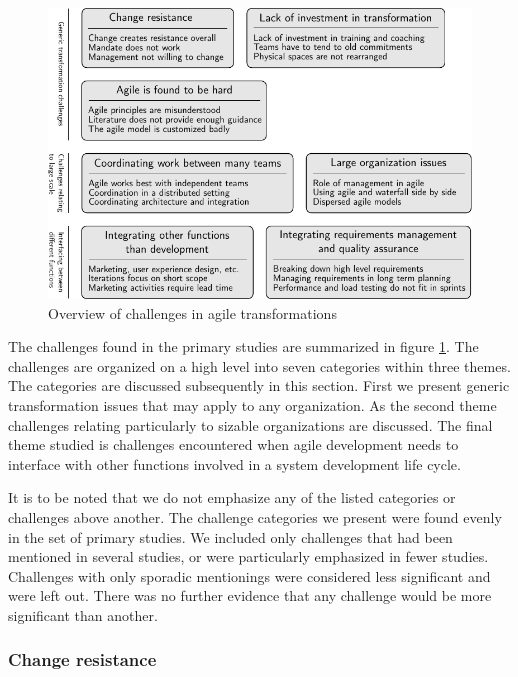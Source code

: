\documentclass[preprint,authoryear,12pt]{elsarticle}
\begin{document}
\begin{figure}[!b]
  \begin{center}
    \includegraphics{graphics/challenges_summary.pdf}
    \caption{Overview of challenges in agile transformations}
    \label{fig:challenges_summary}
  \end{center}
\end{figure}

The challenges found in the primary studies are summarized in figure
\ref{fig:challenges_summary}. The challenges are organized on a high level into
seven categories within three themes. The categories are discussed subsequently
in this section. First we present generic transformation issues that may apply
to any organization. As the second theme challenges relating particularly to
sizable organizations are discussed. The final theme studied is challenges
encountered when agile development needs to interface with other functions
involved in a system development life cycle.

It is to be noted that we do not emphasize any of the listed categories or
challenges above another. The challenge categories we present were found evenly
in the set of primary studies. We included only challenges that had been
mentioned in several studies, or were particularly emphasized in fewer studies.
Challenges with only sporadic mentionings were considered less significant and
were left out. There was no further evidence that any challenge would be more
significant than another.


\subsubsection{Change resistance}
\end{document}
